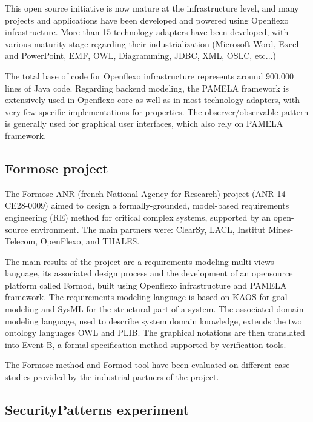This open source initiative is now mature at the infrastructure level, and many projects and applications have been developed and powered using Openflexo infrastructure. More than 15 technology adapters have been developed, with various maturity stage regarding their industrialization (Microsoft Word, Excel and PowerPoint, EMF, OWL, Diagramming, JDBC, XML, OSLC, etc...)

The total base of code for Openflexo infrastructure represents around 900.000 lines of Java code. Regarding backend modeling, the PAMELA framework is extensively used in Openflexo core as well as in most technology adapters, with very few specific implementations for properties. The observer/observable pattern is generally used for graphical user interfaces, which also rely on PAMELA framework. 


\subsection{Formose project}

The Formose ANR (french National Agency for Research) project (ANR-14-CE28-0009)\cite{FormoseWebSite} aimed to design a formally-grounded, model-based requirements engineering (RE) method for critical complex systems, supported by an open-source environment. The main partners were: ClearSy, LACL, Institut Mines-Telecom, OpenFlexo, and THALES. 

The main results of the project are a requirements modeling multi-views language, its associated design process and the development of an opensource platform called Formod\cite{FormodWebSite}, built using Openflexo infrastructure and PAMELA framework. The requirements modeling language is based on KAOS for goal modeling and SysML for the structural part of a system. The associated domain modeling language, used to describe system domain knowledge, extends the two ontology languages OWL and PLIB. The graphical notations are then translated into Event-B, a formal specification method supported by verification tools. 

The Formose method and Formod tool have been evaluated on different case studies provided by the industrial partners of the project.

\subsection{SecurityPatterns experiment}


